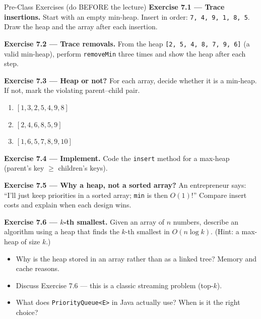 \documentclass[11pt]{article}
\begin{document}
\begin{exbox}{Pre-Class Exercises (do BEFORE the lecture)}
\textbf{Exercise 7.1 --- Trace insertions.} Start with an empty min-heap. Insert in order: \verb|7, 4, 9, 1, 8, 5|. Draw the heap and the array after each insertion.

\textbf{Exercise 7.2 --- Trace removals.} From the heap \texttt{[2, 5, 4, 8, 7, 9, 6]} (a valid min-heap), perform \texttt{removeMin} three times and show the heap after each step.

\textbf{Exercise 7.3 --- Heap or not?} For each array, decide whether it is a min-heap. If not, mark the violating parent--child pair.
\begin{enumerate}[label=(\alph*)]
  \item $[1, 3, 2, 5, 4, 9, 8]$
  \item $[2, 4, 6, 8, 5, 9]$
  \item $[1, 6, 5, 7, 8, 9, 10]$
\end{enumerate}

\textbf{Exercise 7.4 --- Implement.} Code the \verb|insert| method for a max-heap (parent's key $\geq$ children's keys).

\textbf{Exercise 7.5 --- Why a heap, not a sorted array?} An entrepreneur says: ``I'll just keep priorities in a sorted array; \texttt{min} is then $O(1)$!'' Compare insert costs and explain when each design wins.

\textbf{Exercise 7.6 --- $k$-th smallest.} Given an array of $n$ numbers, describe an algorithm using a heap that finds the $k$-th smallest in $O(n\log k)$. (Hint: a max-heap of size $k$.)
\end{exbox}

\begin{disbox}
\begin{itemize}[leftmargin=*]
  \item Why is the heap stored in an array rather than as a linked tree? Memory and cache reasons.
  \item Discuss Exercise 7.6 --- this is a classic streaming problem (top-$k$).
  \item What does \texttt{PriorityQueue<E>} in Java actually use? When is it the right choice?
\end{itemize}
\end{disbox}
\end{document}
